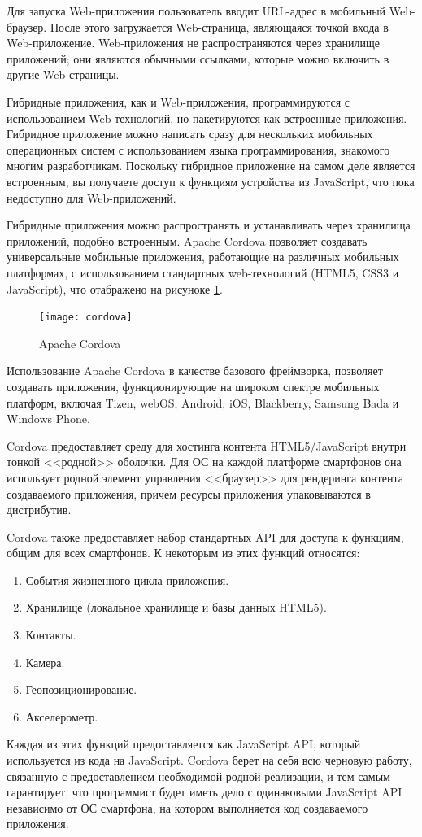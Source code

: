 Для запуска Web-приложения пользователь вводит URL-адрес в мобильный Web-браузер. После этого загружается Web-страница, являющаяся точкой входа в Web-приложение. Web-приложения не распространяются через хранилище приложений; они являются обычными ссылками, которые можно включить в другие Web-страницы.

Гибридные приложения, как и Web-приложения, программируются с использованием Web-технологий, но пакетируются как встроенные приложения. Гибридное приложение можно написать сразу для нескольких мобильных операционных систем с использованием языка программирования, знакомого многим разработчикам. Поскольку гибридное приложение на самом деле является встроенным, вы получаете доступ к функциям устройства из JavaScript, что пока недоступно для Web-приложений.

Гибридные приложения можно распространять и устанавливать через хранилища приложений, подобно встроенным. Apache Cordova позволяет создавать универсальные мобильные приложения, работающие на различных мобильных платформах, с использованием стандартных web-технологий (HTML5, CSS3 и JavaScript), что отабражено на рисуноке \ref{cordova}.

\begin{figure}[ht]
\center\texttt{[image: cordova]}
\caption{Apache Cordova}\label{cordova}
\end{figure}

Использование Apache Cordova в качестве базового фреймворка, позволяет создавать приложения, функционирующие на широком спектре мобильных платформ, включая Tizen, webOS, Android, iOS, Blackberry, Samsung Bada и Windows Phone\cite{cordova}.

Cordova предоставляет среду для хостинга контента HTML5/JavaScript внутри тонкой <<родной>> оболочки. Для ОС на каждой платформе смартфонов она использует родной элемент управления <<браузер>> для рендеринга контента создаваемого приложения, причем ресурсы приложения упаковываются в дистрибутив.

Cordova также предоставляет набор стандартных API для доступа к функциям, общим для всех смартфонов. К некоторым из этих функций относятся:
\begin{enumerate}
\item События жизненного цикла приложения.
\item Хранилище (локальное хранилище и базы данных HTML5).
\item Контакты.
\item Камера.
\item Геопозиционирование.
\item Акселерометр.
\end{enumerate}
Каждая из этих функций предоставляется как JavaScript API, который используется из кода на JavaScript. Cordova берет на себя всю черновую работу, связанную с предоставлением необходимой родной реализации, и тем самым гарантирует, что программист будет иметь дело с одинаковыми JavaScript API независимо от ОС смартфона, на котором выполняется код создаваемого приложения. 

